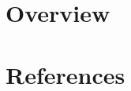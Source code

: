 \documentclass[aspectratio=169]{beamer}
\begin{document}
\section*{Overview}
\begin{frame}
  \tableofcontents %
\end{frame}




\section*{References}
\begin{frame}[allowframebreaks]
  \Large{
    
    
  }
\end{frame}
\end{document}
